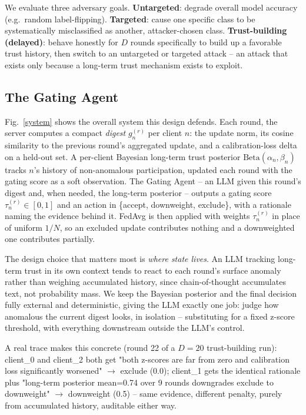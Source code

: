 \documentclass[conference]{IEEEtran}
\begin{document}
We evaluate three adversary goals. \textbf{Untargeted}: degrade overall model accuracy (e.g.\ random label-flipping). \textbf{Targeted}: cause one specific class to be systematically misclassified as another, attacker-chosen class. \textbf{Trust-building (delayed)}: behave honestly for $D$ rounds specifically to build up a favorable trust history, then switch to an untargeted or targeted attack -- an attack that exists only because a long-term trust mechanism exists to exploit.

\subsection{The Gating Agent}
Fig.~\ref{system} shows the overall system this design defends. Each round, the server computes a compact \emph{digest} $g_n^{(r)}$ per client $n$: the update norm, its cosine similarity to the previous round's aggregated update, and a calibration-loss delta on a held-out set. A per-client Bayesian long-term trust posterior $\mathrm{Beta}(\alpha_n,\beta_n)$ \cite{josang2002beta} tracks $n$'s history of non-anomalous participation, updated each round with the gating score as a soft observation. The Gating Agent -- an LLM given this round's digest and, when needed, the long-term posterior -- outputs a gating score $\tau_n^{(r)} \in [0,1]$ and an action in \{accept, downweight, exclude\}, with a rationale naming the evidence behind it. FedAvg is then applied with weights $\tau_n^{(r)}$ in place of uniform $1/N$, so an excluded update contributes nothing and a downweighted one contributes partially.

The design choice that matters most is \emph{where state lives}. An LLM tracking long-term trust in its own context tends to react to each round's surface anomaly rather than weighing accumulated history, since chain-of-thought accumulates text, not probability mass. We keep the Bayesian posterior and the final decision fully external and deterministic, giving the LLM exactly one job: judge how anomalous the current digest looks, in isolation -- substituting for a fixed z-score threshold, with everything downstream outside the LLM's control.

A real trace makes this concrete (round 22 of a $D{=}20$ trust-building run): client\_0 and client\_2 both get "both z-scores are far from zero and calibration loss significantly worsened" $\to$ exclude (0.0); client\_1 gets the identical rationale plus "long-term posterior mean=0.74 over 9 rounds downgrades exclude to downweight" $\to$ downweight (0.5) -- same evidence, different penalty, purely from accumulated history, auditable either way.
\end{document}
